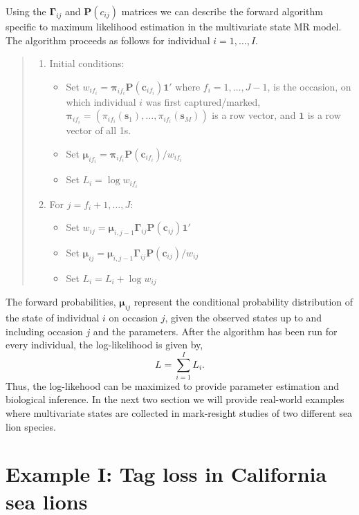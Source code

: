 \documentclass[fleqn]{article}
\newcommand{\bs}{\ensuremath{\mathbf{s}}}
\newcommand{\bc}{\ensuremath{\mathbf{c}}}
\newcommand{\bG}{\ensuremath{\boldsymbol{\Gamma}}}
\newcommand{\bP}{\ensuremath{\mathbf{P}}}
\begin{document}
Using the $\bG_{ij}$ and $\bP(c_{ij})$ matrices we can describe the forward algorithm specific to maximum likelihood estimation in the multivariate state MR model. The algorithm proceeds as follows for individual $i=1,\dots,I$.
\begin{quote}
\begin{enumerate}
\item Initial conditions:
\begin{itemize}
\item Set $w_{if_i} = \boldsymbol{\pi}_{if_i}\bP(\bc_{if_i})\mathbf{1}'$ where $f_i=1,\dots,J-1$, is the occasion, on which individual $i$ was first captured/marked, $\boldsymbol{\pi}_{if_i} = (\pi_{if_i}(\bs_1),\dots,\pi_{if_i}(\bs_M))$ is a row vector, and $\mathbf{1}$ is a row vector of all 1s.
\item Set $\boldsymbol{\mu}_{if_i} = \boldsymbol{\pi}_{if_i}\bP(\bc_{if_i})/w_{if_i}$
\item Set $L_{i} = \log w_{if_i}$
\end{itemize}
\item For $j=f_i+1,\dots,J$:
\begin{itemize}
\item Set $w_{ij} = \boldsymbol{\mu}_{i,j-1}\bG_{ij}\bP(\bc_{ij})\mathbf{1}'$
\item Set $\boldsymbol{\mu}_{ij} = \boldsymbol{\mu}_{i,j-1}\bG_{ij}\bP(\bc_{ij})/w_{ij}$
\item Set $L_i = L_i + \log w_{ij}$
\end{itemize}
\end{enumerate}
\end{quote}
The forward probabilities, $\boldsymbol{\mu}_{ij}$ represent the conditional probability distribution of the state of individual $i$ on occasion $j$, given the observed states up to and including occasion $j$ and the parameters. After the algorithm has been run for every individual, the log-likelihood is given by,
\begin{equation}
L = \sum_{i=1}^I L_i.
\end{equation}
Thus, the log-likehood can be maximized to provide parameter estimation and biological inference. In the next two section we will provide real-world examples where multivariate states are collected in mark-resight studies of two different sea lion species.  

\section{Example I: Tag loss in California sea lions}
\end{document}
